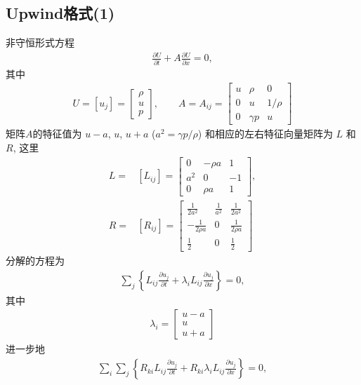 \documentclass[10.5pt
]{article}
\begin{document}
\subsection{Upwind格式(1)}
非守恒形式方程
\begin{align}
\frac{\partial U}{\partial t} + A \frac{\partial U}{\partial x} = 0,
\end{align}
其中
\begin{align}
U = [u_j] = \left[\begin{array}{c}\rho\\ u\\ p\end{array}\right], \qquad A = A_{ij} = \left[\begin{array}{ccc}u & \rho & 0\\
0 & u & 1/\rho\\ 0 & \gamma p & u\end{array}\right]
\end{align}
矩阵$A$的特征值为 $u-a$, $u$, $u+a$ ($a^2 = \gamma p/\rho$) 和相应的左右特征向量矩阵为 $L$ 和 $R$, 这里
\begin{align}
L =& [L_{ij}] = \left[\begin{array}{ccc}0 & -\rho a & 1\\ a^2 & 0 & -1\\ 0 & \rho a & 1\end{array}\right],
\\
R =& [R_{ij}] = \left[\begin{array}{ccc}\frac{1}{2a^2} & \frac{1}{a^2} & \frac{1}{2a^2}\\
-\frac{1}{2\rho a} & 0 & \frac{1}{2\rho a}\\ \frac{1}{2} & 0 & \frac{1}{2}\end{array}\right]
\end{align}
分解的方程为
\begin{align}
\sum_j \left\{L_{ij} \frac{\partial u_j}{\partial t} + \lambda_i L_{ij} \frac{\partial u_j}{\partial
x}\right\} = 0,
\end{align}
其中
\begin{align}
\lambda_i =
\left[\begin{array}{c}u-a \\ u\\ u+a\end{array}\right]
\end{align}
进一步地
\begin{align}
\sum_i \sum_j \left\{R_{ki} L_{ij} \frac{\partial u_j}{\partial t} + R_{ki} \lambda_i L_{ij}
\frac{\partial u_j}{\partial x}\right\} = 0,
\end{align}
\end{document}
